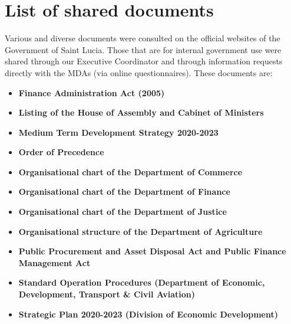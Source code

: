 \documentclass[
  10pt,
]{book}
\begin{document}
\hypertarget{appendixE}{%
\chapter{List of shared documents}\label{appendixE}}

Various and diverse documents were consulted on the official websites of the Government of Saint Lucia. Those that are for internal government use were shared through our Executive Coordinator and through information requests directly with the MDAs (via online questionnaires). These documents are:

\begin{itemize}
\item
  \textbf{Finance Administration Act (2005)}
\item
  \textbf{Listing of the House of Assembly and Cabinet of Ministers}
\item
  \textbf{Medium Term Development Strategy 2020-2023}
\item
  \textbf{Order of Precedence}
\item
  \textbf{Organisational chart of the Department of Commerce}
\item
  \textbf{Organisational chart of the Department of Finance}
\item
  \textbf{Organisational chart of the Department of Justice}
\item
  \textbf{Organisational structure of the Department of Agriculture}
\item
  \textbf{Public Procurement and Asset Disposal Act and Public Finance Management Act}
\item
  \textbf{Standard Operation Procedures (Department of Economic, Development, Transport \& Civil Aviation)}
\item
  \textbf{Strategic Plan 2020-2023 (Division of Economic Development)}
\end{itemize}

  
\end{document}
